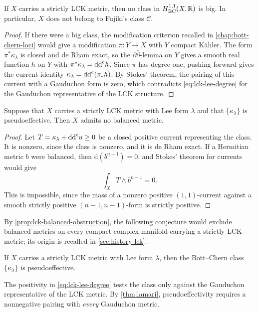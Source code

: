 \begin{corollary}\label{cor:lck-no-closed-big-class}
If $X$ carries a strictly LCK metric, then no class in $H^{1,1}_{\mathrm{BC}}(X,\mathbb R)$ is big. In particular, $X$ does not belong to Fujiki's class $\mathcal C$.
\end{corollary}
\begin{proof}
If there were a big class, the modification criterion recalled in \cref{chap:bott-chern-loci} would give a modification $\pi\colon Y\to X$ with $Y$ compact K\"ahler. The form $\pi^*\kappa_\lambda$ is closed and de Rham exact, so the $\partial\bar\partial$-lemma on $Y$ gives a smooth real function $h$ on $Y$ with $\pi^*\kappa_\lambda=\mathrm{dd}^{\mathrm{c}} h$. Since $\pi$ has degree one, pushing forward gives the current identity $\kappa_\lambda=\mathrm{dd}^{\mathrm{c}}(\pi_*h)$. By Stokes' theorem, the pairing of this current with a Gauduchon form is zero, which contradicts \eqref{eq:lck-lee-degree} for the Gauduchon representative of the LCK structure.
\end{proof}

\begin{proposition}\label{prop:lck-balanced-obstruction}
Suppose that $X$ carries a strictly LCK metric with Lee form $\lambda$ and that $\{\kappa_\lambda\}$ is pseudoeffective. Then $X$ admits no balanced metric.
\end{proposition}
\begin{proof}
Let $T=\kappa_\lambda+\mathrm{dd}^{\mathrm{c}} u\geq0$ be a closed positive current representing the class. It is nonzero, since the class is nonzero, and it is de Rham exact. If a Hermitian metric $b$ were balanced, then $\mathrm{d}(b^{n-1})=0$, and Stokes' theorem for currents would give
\[
 \int_XT\wedge b^{n-1}=0.
\]
This is impossible, since the mass of a nonzero positive $(1,1)$-current against a smooth strictly positive $(n-1,n-1)$-form is strictly positive.
\end{proof}

By \cref{prop:lck-balanced-obstruction}, the following conjecture would exclude balanced metrics on every compact complex manifold carrying a strictly LCK metric; its origin is recalled in \cref{sec:history-lck}.

\begin{conjecture}\label{conj:lck-lee-psef}
If $X$ carries a strictly LCK metric with Lee form $\lambda$, then the Bott--Chern class $\{\kappa_\lambda\}$ is pseudoeffective.
\end{conjecture}

The positivity in \eqref{eq:lck-lee-degree} tests the class only against the Gauduchon representative of the LCK metric. By \cref{thm:lamari}, pseudoeffectivity requires a nonnegative pairing with \emph{every} Gauduchon metric.

